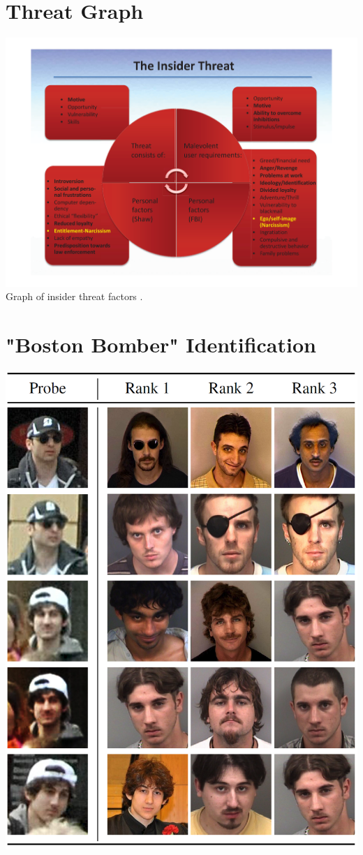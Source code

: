 \documentclass[12pt]{article}
\begin{document}
\newpage
\begin{appendices}
\section{Threat Graph}
\label{appendix:threatgraph}
\includegraphics[width=\linewidth]{res/threat_graph.png}
Graph of insider threat factors \citep{behaviourdetection}.

\section{"Boston Bomber" Identification}
\label{appendix:bostonbomber}
\includegraphics[scale=0.8]{res/boston_bomber.png}


\end{appendices}
\end{document}
